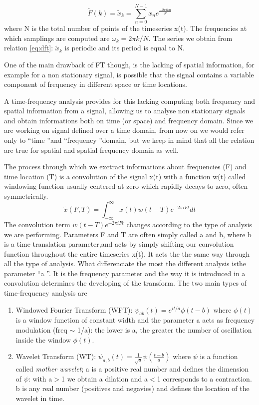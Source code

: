 \documentclass[10pt]{report}
\begin{document}
\begin{equation}\label{eq:dft}
 \tilde{F}(k) = \tilde{x}_k = \sum_{n = 0}^{N-1}x_n e^{\frac{-2\pi i k n}{N}}
\end{equation}
where N is the total number of points of the timeseries x(t).
The frequencies at which samplings are computed are $\omega_k = 2\pi k/N$.
The series we obtain from relation \ref{eq:dft}: $\tilde{x}_k$ is periodic and its period is equal to N.

One of the main drawback of FT though, is the lacking of spatial information, for example for a non stationary signal, is possible that the signal contains a variable component of frequency in different space or time locations.

A time-frequency analysis provides for this lacking computing both frequency and spatial information from a signal, allowing us to analyse non stationary signals and obtain informations both on time (or space) and frequency domain.
Since we are working on signal defined over a time domain, from now on we would refer only to  \textquotedblleft time \textquotedblright  and  \textquotedblleft frequency \textquotedblright domain, but we keep in mind that all the relation are true for spatial and spatial frequency domain as well.

The process through which we exctract informations about frequencies (F) and time location (T) is a convolution of the signal x(t) with a function w(t) called windowing function usually centered at zero which rapidly decays to zero, often symmetrically.
\begin{equation}
\tilde{x}(F, T) = \int_{-\infty}^{\infty} x(t)w(t-T) e^{-2\pi i F t} dt
\end{equation}
The convolution term $w(t-T) e^{-2\pi i F t}$ changes according to the type of analysis we are performing. Parameters F and T are often simply called a and b, where b is a time translation parameter,and acts by simply shifting our convolution function throughout the entire timeseries x(t). It acts the the same way through all the type of analysis.
What differenciate the most the different analysis isthe parameter \textquotedblleft a \textquotedblright.
It is the frequency parameter and the way it is introduced in a convolution determines the developing of the transform.
The two main types of time-frequency analysis are

\begin{enumerate}
\item Windowed Fourier Transform (WFT): $\psi_{ab}(t) = e^{it/a}\phi(t-b)$ where $\phi(t)$ is a window function of constant width and the parameter a acts as frequency modulation (freq $\sim$ 1/a): the lower is a, the greater the number of oscillation inside the window $\phi(t)$.
\item Wavelet Transform (WT): $\psi_{a, b}(t) = \frac{1}{\sqrt{a}}\psi(\frac{t-b}{a})$ where $\psi$ is a function called \emph{mother wavelet}; a is a positive real number and defines the dimension of $\psi$: with a$>$1 we obtain a dilation and a$<$1 corresponds to a contraction. b is any real number (positives and negavies) and defines the location of the wavelet in time.
\end{enumerate}
\end{document}
